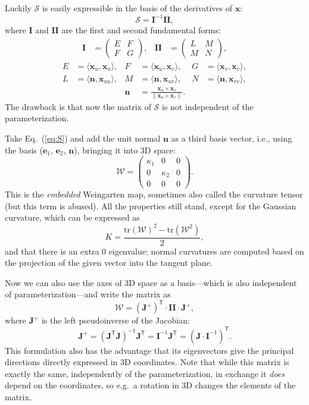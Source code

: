 \documentclass[a4paper]{article}
\begin{document}
Luckily $\mathcal{S}$ is easily expressible in the basis of the derivatives of
$\mathbf{x}$:
\begin{equation}
  \mathcal{S}=\mathbf{I}^{-1}\mathbf{I\!I},
  \label{eq:S2}
\end{equation}
where $\mathbf{I}$ and $\mathbf{I\!I}$ are the first and second fundamental forms:
\begin{align*}
  \mathbf{I} &= \begin{pmatrix}E&F\\F&G\end{pmatrix}, &
  \mathbf{I\!I} &= \begin{pmatrix}L&M\\M&N\end{pmatrix},
\end{align*}
\begin{align*}
  E &= \langle\mathbf{x}_u,\mathbf{x}_u\rangle, &
  F &= \langle\mathbf{x}_u,\mathbf{x}_v\rangle, &
  G &= \langle\mathbf{x}_v,\mathbf{x}_v\rangle,\\
  L &= \langle\mathbf{n},\mathbf{x}_{uu}\rangle, &
  M &= \langle\mathbf{n},\mathbf{x}_{uv}\rangle, &
  N &= \langle\mathbf{n},\mathbf{x}_{vv}\rangle,\\
  && \mathbf{n} &= \frac{\mathbf{x}_u\times\mathbf{x}_v}{\|{\mathbf{x}_u\times\mathbf{x}_v}\|}. &&
\end{align*}
The drawback is that now the matrix of $\mathcal{S}$ is not independent of the parameterization.

Take Eq.~(\ref{eq:S}) and add the unit normal $\mathbf{n}$ as a
third basis vector, i.e., using the basis ($\mathbf{e}_1$,
$\mathbf{e}_2$, $\mathbf{n}$), bringing it into 3D space:
\[
  \mathcal{W}=
  \begin{pmatrix}
    \kappa_1 & 0 & 0\\
    0 & \kappa_2 & 0\\
    0 & 0 & 0
  \end{pmatrix}.
\]
This is the \emph{embedded} Weingarten map, sometimes also called the
curvature tensor (but this term is abused). All the properties still
stand, except for the Gaussian curvature, which can be expressed as
\[K = \frac{\mathrm{tr}(\mathcal{W})^2-\mathrm{tr}(\mathcal{W}^2)}{2},\]
and that there is an extra $0$ eigenvalue; normal curvatures are
computed based on the projection of the given vector into the tangent plane.

Now we can also use the axes of 3D space as a basis---which is also
independent of parameterization---and write the matrix as
\begin{equation}
  \mathcal{W}=(\mathbf{J}^+)^\textsf{T}\cdot\mathbf{I\!I}\cdot\mathbf{J}^+,
  \label{eq:W}
\end{equation}
where $\mathbf{J}^+$ is the left pseudoinverse of the Jacobian:
\[\mathbf{J}^+=
(\mathbf{J}^\textsf{T}\mathbf{J})^{-1}\mathbf{J}^\textsf{T}=
\mathbf{I}^{-1}\mathbf{J}^\textsf{T}=
(\mathbf{J}\cdot\mathbf{I}^{-1})^\textsf{T}.\]
This formulation also has the advantage that its eigenvectors give the
principal directions directly expressed in 3D coordinates. Note that
while this matrix is exactly the same, independently of the
parameterization, in exchange it \emph{does} depend on the
coordinates, so e.g.~a rotation in 3D changes the elements of the
matrix.
\end{document}
